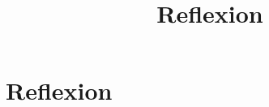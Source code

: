 \documentclass[12pt]{article}
\title{Reflexion}
\begin{document}
\section{Reflexion}
\end{document}
